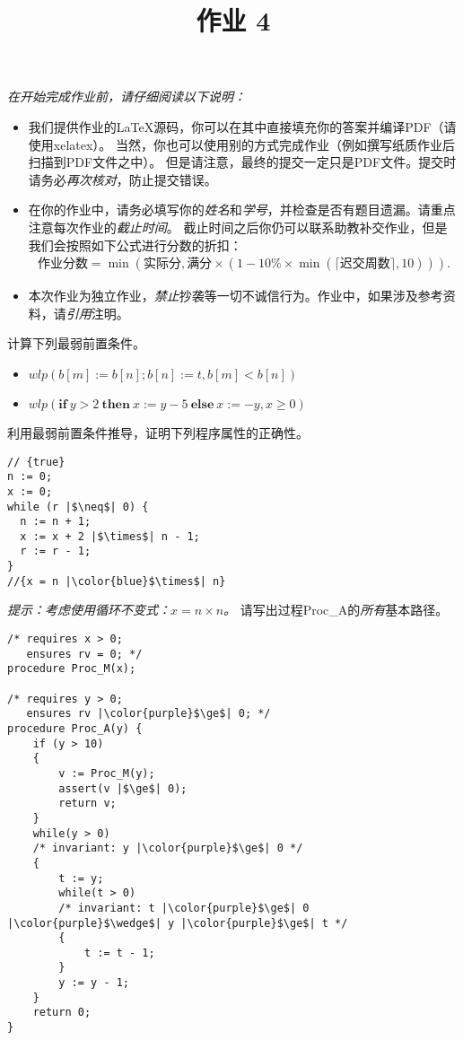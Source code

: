 \documentclass[11pt,a4paper]{article}
\title{作业 4}
\begin{document}
\maketitle

\textit{在开始完成作业前，请仔细阅读以下说明：}
\begin{itemize}
    \item 我们提供作业的\LaTeX 源码，你可以在其中直接填充你的答案并编译PDF（请使用xelatex）。
    当然，你也可以使用别的方式完成作业（例如撰写纸质作业后扫描到PDF文件之中）。
    但是请注意，最终的提交一定只是PDF文件。提交时请务必\emph{再次核对}，防止提交错误。
    \item 在你的作业中，请务必填写你的\emph{姓名}和\emph{学号}，并检查是否有题目遗漏。请重点注意每次作业的\emph{截止时间}。
    截止时间之后你仍可以联系助教补交作业，但是我们会按照如下公式进行分数的折扣：
    \begin{align*}
        \text{作业分数} = \min\left(\text{实际分}, \text{满分}\times\left(1 - 10\%\times\min\left(\lceil\text{迟交周数}\rceil, 10\right)\right)\right).
    \end{align*}
    \item 本次作业为独立作业，\emph{禁止}抄袭等一切不诚信行为。作业中，如果涉及参考资料，请\emph{引用}注明。
\end{itemize}



\subproblem 计算下列最弱前置条件。
\begin{itemize}
    \item $wlp(b[m]:=b[n];b[n]:=t, b[m] < b[n])$
    \item $wlp(\textbf{if}\ y > 2\ \textbf{then}\ x:= y - 5\ \textbf{else}\ x:= -y, x \ge 0)$
\end{itemize}
\begin{solution}
\end{solution}

\subproblem 利用最弱前置条件推导，证明下列程序属性的正确性。
\begin{lstlisting}
// {true}
n := 0;
x := 0;
while (r |$\neq$| 0) {
  n := n + 1;
  x := x + 2 |$\times$| n - 1;
  r := r - 1;
}
//{x = n |\color{blue}$\times$| n}
\end{lstlisting}

\textit{提示：考虑使用循环不变式：$x = n \times n$。}
\newpage
{}
\subproblem 请写出过程Proc\_A的\emph{所有}基本路径。
\begin{lstlisting}
/* requires x > 0;
   ensures rv = 0; */
procedure Proc_M(x);

/* requires y > 0;
   ensures rv |\color{purple}$\ge$| 0; */
procedure Proc_A(y) {
    if (y > 10)
    {
        v := Proc_M(y);
        assert(v |$\ge$| 0);
        return v;
    }
    while(y > 0)
    /* invariant: y |\color{purple}$\ge$| 0 */
    {
        t := y;
        while(t > 0)
        /* invariant: t |\color{purple}$\ge$| 0 |\color{purple}$\wedge$| y |\color{purple}$\ge$| t */
        {
            t := t - 1;
        }
        y := y - 1;
    }
    return 0;
}

\end{lstlisting}
\begin{solution}
\end{solution}
\end{document}
